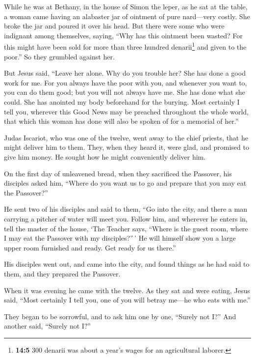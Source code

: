  While he was at Bethany, in the house of Simon the leper,
as he sat at the table, a woman came having an alabaster jar of ointment
of pure nard---very costly. She broke the jar and poured it over his
head.  But there were some who were indignant among
themselves, saying, ``Why has this ointment been wasted? 
For this might have been sold for more than three hundred
denarii\footnote{\textbf{14:5} 300 denarii was about a year's wages for
  an agricultural laborer.} and given to the poor.'' So they grumbled
against her.

 But Jesus said, ``Leave her alone. Why do you trouble
her? She has done a good work for me.  For you always have
the poor with you, and whenever you want to, you can do them good; but
you will not always have me.  She has done what she could.
She has anointed my body beforehand for the burying.  Most
certainly I tell you, wherever this Good News may be preached throughout
the whole world, that which this woman has done will also be spoken of
for a memorial of her.''

 Judas Iscariot, who was one of the twelve, went away to
the chief priests, that he might deliver him to them. 
They, when they heard it, were glad, and promised to give him money. He
sought how he might conveniently deliver him.

 On the first day of unleavened bread, when they
sacrificed the Passover, his disciples asked him, ``Where do you want us
to go and prepare that you may eat the Passover?''

 He sent two of his disciples and said to them, ``Go into
the city, and there a man carrying a pitcher of water will meet you.
Follow him,  and wherever he enters in, tell the master
of the house, `The Teacher says, ``Where is the guest room, where I may
eat the Passover with my disciples?''\,'  He will himself
show you a large upper room furnished and ready. Get ready for us
there.''

 His disciples went out, and came into the city, and
found things as he had said to them, and they prepared the Passover.

 When it was evening he came with the twelve.
 As they sat and were eating, Jesus said, ``Most
certainly I tell you, one of you will betray me---he who eats with me.''

 They began to be sorrowful, and to ask him one by one,
``Surely not I?'' And another said, ``Surely not I?''

